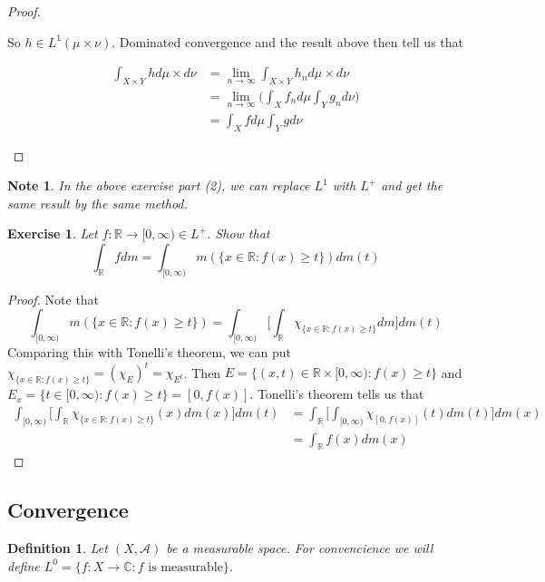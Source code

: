 \documentclass[12pt]{amsart}
\newtheorem{defn}[thm]{Definition}
\newtheorem{note}[thm]{Note}
\newtheorem{ex}[thm]{Exercise}
\newcommand{\C}{\mathbb{C}}
\newcommand{\R}{\mathbb{R}}
\newcommand{\MA}{\mathcal{A}}
\newcommand{\Rg}{[0,\infty)}
\newcommand{\limn}{\lim \limits_{n \rightarrow \infty}}
\begin{document}
\begin{proof}
\begin{enumerate}
			So $h \in L^1(\mu \times \nu)$. Dominated convergence and the result above then tell us that 
			
			\begin{align*}
				\int_{X \times Y} h d\mu \times d\nu 
				&= \limn \int_{X \times Y} h_n d\mu \times d\nu \\
				&= \limn \bigg( \int_X f_n d\mu \int_Y g_n d\nu \bigg)\\
				&= \int_X f d\mu \int_Y g d\nu
			\end{align*}
			
		\end{enumerate}
	\end{proof}
	
	\begin{note}
		In the above exercise part (2), we can replace $L^1$ with $L^+$ and get the same result by the same method.
	\end{note}
	
	\begin{ex}
		Let $f:\R \rightarrow \Rg \in L^+$. Show that $$\int_{\R}fdm = \int_{\Rg}m(\{x \in \R: f(x) \geq t\}) dm(t)$$
	\end{ex}
	
	\begin{proof}
		Note that $$\int_{\Rg}m(\{x \in \R: f(x) \geq t\}) = \int_{\Rg} \bigg[\int_{\R} \chi_{\{x \in \R: f(x) \geq t\}}dm \bigg]dm(t)$$
		Comparing this with Tonelli's theorem, we can put $\chi_{\{x \in \R: f(x) \geq t\}} = (\chi_{E})^t = \chi_{E^t}$. Then $E = \{(x,t) \in \R \times \Rg: f(x) \geq t\}$ and $E_x = \{t \in \Rg: f(x) \geq t\} = [0,f(x)]$. Tonelli's theorem tells us that 
		\begin{align*}
			\int_{\Rg} \bigg[\int_{\R} \chi_{\{x \in \R: f(x) \geq t\}}(x) dm(x) \bigg]dm(t)
			&= \int_{\R} \bigg[ \int_{\Rg} \chi_{[0,f(x)]}(t) dm(t) \bigg] dm(x)\\
			&= \int_{\R} f(x) dm(x)
		\end{align*} 
	\end{proof}
	
	\subsection{Convergence}
	
	\begin{defn}
		Let $(X, \MA)$ be a measurable space. For convencience we will define $L^0 = \{f:X \rightarrow \C: f \text{ is measurable}\}$.
	\end{defn}
	
\end{document}

